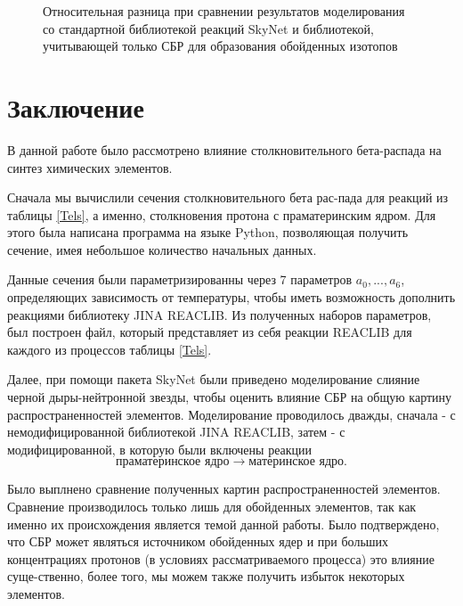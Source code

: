 \documentclass[14pt, a4paper]{article}
\numberwithin{figure}{section}
\numberwithin{equation}{section}
\begin{document}
\begin{figure}
	\caption{Относительная разница при сравнении результатов моделирования со стандартной библиотекой реакций SkyNet и библиотекой, учитывающей только СБР для образования обойденных изотопов}
	\label{ris:result-err}
\end{figure}

\section*{\centering Заключение}
В данной работе было рассмотрено влияние столкновительного бета-распада на синтез химических элементов.

Сначала мы вычислили сечения столкновительного бета рас-пада для реакций из таблицы \ref{Tels}, а именно, столкновения протона с праматеринским ядром. Для этого была написана программа на языке Python, позволяющая получить сечение, имея небольшое количество начальных данных.

Данные сечения были параметризированны через 7 параметров $a_0, ..., a_6$, определяющих зависимость от температуры, чтобы иметь возможность дополнить реакциями библиотеку JINA REACLIB. Из полученных наборов параметров, был построен файл, который представляет из себя реакции REACLIB для каждого из процессов таблицы \ref{Tels}.


Далее, при помощи пакета SkyNet были приведено моделирование слияние черной дыры-нейтронной звезды, чтобы оценить влияние СБР на общую картину распространенностей элементов. Моделирование проводилось дважды, сначала - с немодифицированной библиотекой JINA REACLIB, затем - с модифицированной, в которую были включены реакции $$\text{праматеринское ядро} \to \text{материнское ядро}.$$

Было выплнено сравнение полученных картин распространенностей элементов.  Сравнение производилось только лишь для обойденных элементов, так как именно их происхождения является темой данной работы. Было подтверждено, что СБР может являться источником обойденных ядер и при больших концентрациях протонов (в условиях рассматриваемого процесса) это влияние суще-ственно, более того, мы можем также получить избыток некоторых элементов.
\end{document}
